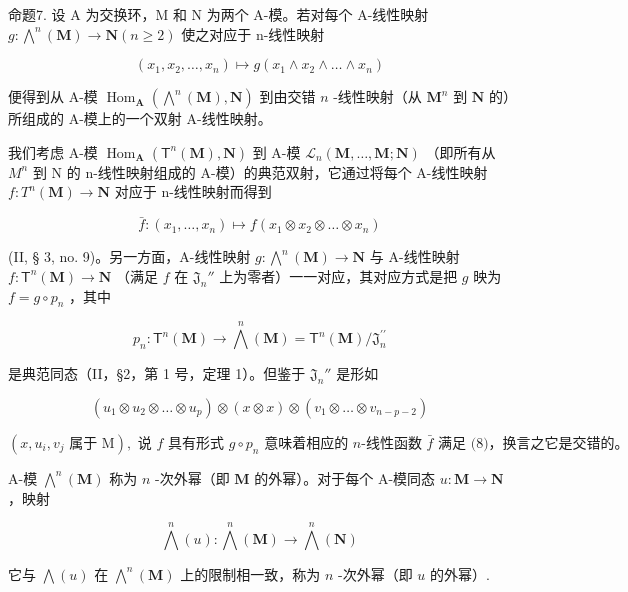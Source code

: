 命题7. 设 A 为交换环，M 和 N 为两个 A-模。若对每个 A-线性映射 \(g: \bigwedge^n (\mathbf{M}) \to \mathbf{N} (n \geqslant 2)\) 使之对应于 n-线性映射

\[
\left(x _ {1}, x _ {2}, \dots , x _ {n}\right) \mapsto g \left(x _ {1} \wedge x _ {2} \wedge \dots \wedge x _ {n}\right)\tag{9}
\]

便得到从 A-模 \(\operatorname{Hom}_{\mathbf{A}}(\bigwedge^{n}(\mathbf{M}), \mathbf{N})\) 到由交错 \(n\) -线性映射（从 \(\mathbf{M}^n\) 到 \(\mathbf{N}\) 的）所组成的 A-模上的一个双射 A-线性映射。

我们考虑 A-模 \(\operatorname{Hom}_{\mathbf{A}}(\mathsf{T}^{n}(\mathbf{M}),\mathbf{N})\) 到 A-模 \(\mathcal{L}_{n}(\mathbf{M},\ldots,\mathbf{M};\mathbf{N})\) （即所有从 \(M^{n}\) 到 N 的 n-线性映射组成的 A-模）的典范双射，它通过将每个 A-线性映射 \(f: T^{n}(\mathbf{M}) \to \mathbf{N}\) 对应于 n-线性映射而得到

\[
\bar {f} \colon (x _ {1}, \dots , x _ {n}) \mapsto f (x _ {1} \otimes x _ {2} \otimes \dots \otimes x _ {n})
\]

(II, § 3, no. 9)。另一方面，A-线性映射 \(g \colon \bigwedge^{n}(\mathbf{M}) \to \mathbf{N}\) 与 A-线性映射 \(f \colon \mathsf{T}^n (\mathbf{M}) \to \mathbf{N}\) （满足 \(f\) 在 \(\mathfrak{J}_n''\) 上为零者）一一对应，其对应方式是把 \(g\) 映为 \(f = g \circ p_n\) ，其中

\[
p _ {n} \colon \mathsf {T} ^ {n} (\mathbf {M}) \rightarrow \bigwedge^ {n} (\mathbf {M}) = \mathsf {T} ^ {n} (\mathbf {M}) / \mathfrak {J} _ {n} ^ {\prime \prime}
\]

是典范同态（II，§2，第 1 号，定理 1）。但鉴于 \(\mathfrak{J}_n''\) 是形如

\[
\left(u _ {1} \otimes u _ {2} \otimes \dots \otimes u _ {p}\right) \otimes (x \otimes x) \otimes \left(v _ {1} \otimes \dots \otimes v _ {n - p - 2}\right)
\]

\((x, u_{i}, v_{j} \text{ 属于 M}), \text{ 说 } f \text{ 具有形式 } g \circ p_{n} \text{ 意味着相应的 } n\text{-线性函数 } \bar{f} \text{ 满足 (8)，换言之它是交错的。}\)

A-模 \(\bigwedge^{n}(\mathbf{M})\) 称为 \(n\) -次外幂（即 \(\mathbf{M}\) 的外幂）。对于每个 A-模同态 \(u: \mathbf{M} \to \mathbf{N}\) ，映射

\[
\bigwedge^ {n} (u): \bigwedge^ {n} (\mathbf {M}) \rightarrow \bigwedge^ {n} (\mathbf {N})
\]

它与 \(\bigwedge(u)\) 在 \(\bigwedge^{n}(\mathbf{M})\) 上的限制相一致，称为 \(n\) -次外幂（即 \(u\) 的外幂）.

